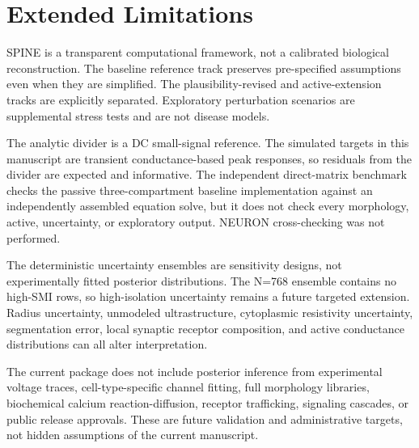 \section{Extended Limitations}

SPINE is a transparent computational framework, not a calibrated biological reconstruction. The baseline reference track preserves pre-specified assumptions even when they are simplified. The plausibility-revised and active-extension tracks are explicitly separated. Exploratory perturbation scenarios are supplemental stress tests and are not disease models.

The analytic divider is a DC small-signal reference. The simulated targets in this manuscript are transient conductance-based peak responses, so residuals from the divider are expected and informative. The independent direct-matrix benchmark checks the passive three-compartment baseline implementation against an independently assembled equation solve, but it does not check every morphology, active, uncertainty, or exploratory output. NEURON cross-checking was not performed.

The deterministic uncertainty ensembles are sensitivity designs, not experimentally fitted posterior distributions. The N=768 ensemble contains no high-SMI rows, so high-isolation uncertainty remains a future targeted extension. Radius uncertainty, unmodeled ultrastructure, cytoplasmic resistivity uncertainty, segmentation error, local synaptic receptor composition, and active conductance distributions can all alter interpretation.

The current package does not include posterior inference from experimental voltage traces, cell-type-specific channel fitting, full morphology libraries, biochemical calcium reaction-diffusion, receptor trafficking, signaling cascades, or public release approvals. These are future validation and administrative targets, not hidden assumptions of the current manuscript.
